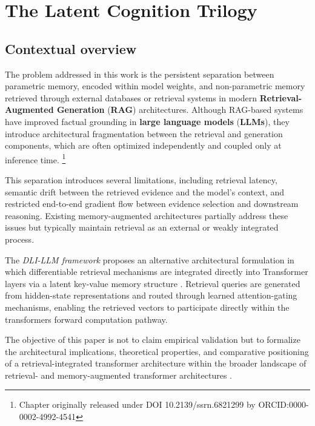 \chapter{The Latent Cognition Trilogy}

\section{Contextual overview} 

The problem addressed in this work is the persistent separation between parametric memory, encoded within model weights, and non-parametric memory retrieved through external databases or retrieval systems in modern \textbf{Retrieval-Augmented Generation} (\textbf{RAG}) architectures. Although RAG-based systems have improved factual grounding in \textbf{large language models} (\textbf{LLMs}), they introduce architectural fragmentation between the retrieval and generation components, which are often optimized independently and coupled only at inference time. \footnote{Chapter originally released under DOI 10.2139/ssrn.6821299 by ORCID:0000-0002-4992-4541}

This separation introduces several limitations, including retrieval latency, semantic drift between the retrieved evidence and the model's context, and restricted end-to-end gradient flow between evidence selection and downstream reasoning. Existing memory-augmented architectures partially address these issues but typically maintain retrieval as an external or weakly integrated process.

The \emph{DLI-LLM framework} proposes an alternative architectural formulation in which differentiable retrieval mechanisms are integrated directly into Transformer layers via a latent key-value memory structure \cite{Bahdanau2015}. Retrieval queries are generated from hidden-state representations and routed through learned attention-gating mechanisms, enabling the retrieved vectors to participate directly within the transformer\textquotesingle s forward computation pathway.

The objective of this paper is not to claim empirical validation but to formalize the architectural implications, theoretical properties, and comparative positioning of a retrieval-integrated transformer architecture within the broader landscape of retrieval- and memory-augmented transformer architectures \cite{Lewis2021, Khandelwal2020, Qu2021, Schmid2011}.

